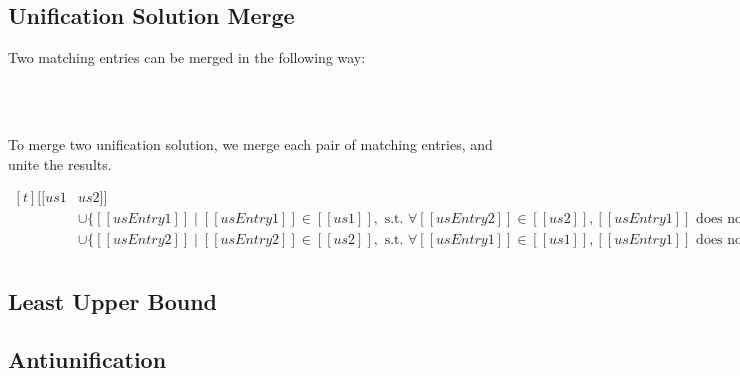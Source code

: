 \documentclass[a4,natbib=false]{article}
\begin{document}
\subsection{Unification Solution Merge}

Two matching entries can be merged in the following way:
\begin{definition} \hfill \\
\ottdefnSME\\
\end{definition}


To merge two unification solution, we merge each pair of
matching entries, and unite the results.

\begin{definition}
  $\begin{aligned}[t]
  [[us1 & us2]] &= \{ [[usEntry1 & usEntry2]] \mid [[usEntry1]] \in [[us1]],
  [[usEntry2]]  \in [[us2]], \text{s.t. } [[usEntry1]] \text{ matches with }
                                   [[usEntry2]] \}\\
                &\cup
                                     \{ [[usEntry1]] \mid [[usEntry1]] \in
                                     [[us1]], \text{ s.t. }
                                     \forall [[usEntry2]]  \in [[us2]],
                                     [[usEntry1]] \text{ does not match with }
                                                     [[usEntry2]] \}\\
        &\cup
          \{ [[usEntry2]] \mid [[usEntry2]] \in
          [[us2]], \text{ s.t. }
          \forall [[usEntry1]]  \in [[us1]],
          [[usEntry1]] \text{ does not match with }
          [[usEntry2]] \}\\
   \end{aligned}$
\end{definition}



\subsection{Least Upper Bound}
\ottdefnsLUB

\subsection{Antiunification}
\ottdefnsAU
\end{document}
